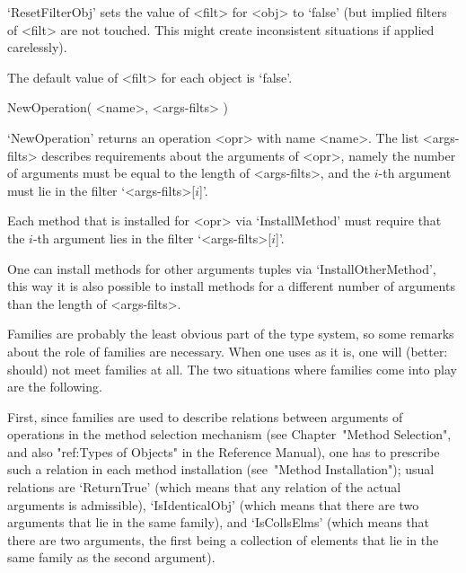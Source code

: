 `ResetFilterObj' sets the value of <filt> for <obj> to `false' (but implied
filters of <filt> are not touched. This might create inconsistent situations
if applied carelessly).

The default value of <filt> for each object is `false'.




\>NewOperation( <name>, <args-filts> )

`NewOperation' returns an operation <opr> with name <name>.
The list <args-filts> describes requirements about the arguments
of <opr>, namely the number of arguments must be equal to the length of
<args-filts>, and the $i$-th argument must lie in the filter
`<args-filts>[$i$]'.

Each method that is installed for <opr> via `InstallMethod' must require
that the $i$-th argument lies in the filter `<args-filts>[$i$]'.

One can install methods for other arguments tuples via
`InstallOtherMethod',
this way it is also possible to install methods for a different number
of arguments than the length of <args-filts>.



Families are probably the least obvious part of the {\GAP} type system,
so some remarks about the role of families are necessary.
When one uses {\GAP} as it is, one will (better: should) not meet
families at all.
The two situations where families come into play are the following.

First, since families are used to describe relations between arguments of
operations in the method selection mechanism
(see Chapter~"Method Selection",
and also "ref:Types of Objects" in the Reference Manual),
one has to prescribe such a relation in each method installation
(see~"Method Installation");
usual relations are `ReturnTrue' (which means that any relation of the
actual arguments is admissible), `IsIdenticalObj' (which means that
there are two arguments that lie in the same family),
and `IsCollsElms' (which means that there are two arguments,
the first being a collection of elements that lie in the same family
as the second argument).

